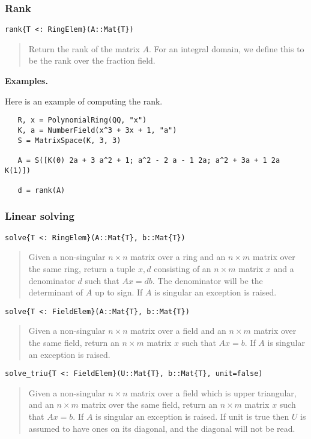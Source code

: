 \documentclass[a4paper,10pt]{article}
\newcommand{\desc}[1]{\vspace{-3mm}\begin{quote}#1\end{quote}}
\begin{document}
\subsubsection{Rank}

\begin{lstlisting}
rank{T <: RingElem}(A::Mat{T})
\end{lstlisting}

\desc{Return the rank of the matrix $A$. For an integral domain, we define this
to be the rank over the fraction field.}

\textbf{Examples.}

Here is an example of computing the rank.

\begin{lstlisting}
   R, x = PolynomialRing(QQ, "x")
   K, a = NumberField(x^3 + 3x + 1, "a")
   S = MatrixSpace(K, 3, 3)
   
   A = S([K(0) 2a + 3 a^2 + 1; a^2 - 2 a - 1 2a; a^2 + 3a + 1 2a K(1)])

   d = rank(A)
\end{lstlisting}

\subsubsection{Linear solving}

\begin{lstlisting}
solve{T <: RingElem}(A::Mat{T}, b::Mat{T})
\end{lstlisting}

\desc{Given a non-singular $n\times n$ matrix over a ring and an $n\times m$
matrix over the same ring, return a tuple $x, d$ consisting of an
$n\times m$ matrix $x$ and a denominator $d$ such that $Ax = db$. The
denominator will be the determinant of $A$ up to sign. If $A$ is singular an
exception is raised.}

\begin{lstlisting}
solve{T <: FieldElem}(A::Mat{T}, b::Mat{T})
\end{lstlisting}

\desc{Given a non-singular $n\times n$ matrix over a field and an $n\times m$
matrix over the same field, return an $n\times m$ matrix $x$
such that $Ax = b$. If $A$ is singular an exception is raised.}

\begin{lstlisting}
solve_triu{T <: FieldElem}(U::Mat{T}, b::Mat{T}, unit=false)
\end{lstlisting}

\desc{Given a non-singular $n\times n$ matrix over a field which is upper
triangular, and an $n\times m$ matrix over the same field, return an
$n\times m$ matrix $x$ such that $Ax = b$. If $A$ is singular an exception
is raised. If unit is true then $U$ is assumed to have ones on its
diagonal, and the diagonal will not be read.}
\end{document}
